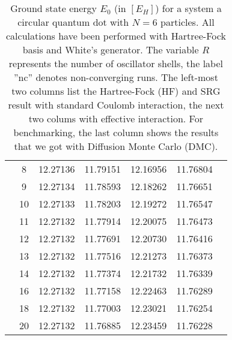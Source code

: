 \begin{table}[h!]
\begin{center}
\begin{tabular}{|c|c|c|c|c|c|c|}
& 8&12.27136 &11.79151 &12.16956 &11.76804 & \\
& 9&12.27134 &11.78593 &12.18262 &11.76651 & \\
& 10&12.27133 &11.78203 &12.19272 &11.76547 & \\
& 11&12.27132 &11.77914 &12.20075 & 11.76473 & \\
& 12&12.27132 &11.77691 &12.20730 & 11.76416 & \\
& 13&12.27132 &11.77516 & 12.21273&11.76373  & \\ 
&14 & 12.27132 &11.77374 &12.21732 &11.76339 & \\
&16 &12.27132 &11.77158 &12.22463 &11.76289 & \\
& 18&12.27132 &11.77003 &12.23021 &11.76254 & \\
& 20&12.27132 &11.76885 &12.23459 & 11.76228 & \\
\hline
\end{tabular}
\end{center}
\caption{Ground state energy $E_0$ (in $\left[E_H\right]$) for a system a circular quantum dot with $N=6$ particles. All calculations have been performed with Hartree-Fock basis and White's generator. The variable $R$ represents the number of oscillator shells, the label ''nc'' denotes non-converging runs. The left-most two columns list the Hartree-Fock (HF) and SRG result with standard Coulomb interaction, the next two colums with effective interaction.
For benchmarking, the last column shows the results that we got with Diffusion Monte Carlo (DMC).}
\label{tab:fulltab3}
\end{table}


